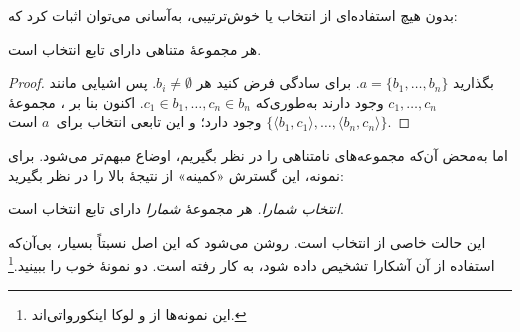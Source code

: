 \documentclass[../../../include/open-logic-section]{subfiles}
\begin{document}

بدون هیچ استفاده‌ای از انتخاب یا خوش‌ترتیبی، به‌آسانی می‌توان اثبات
کرد که:

\begin{lem}[در $\Zminus$]
هر مجموعهٔ متناهی دارای تابع انتخاب است.
\end{lem}

\begin{proof}
بگذارید $a = \{b_1, \ldots, b_n\}$. برای سادگی فرض کنید هر
$b_i \neq \emptyset$. پس اشیایی مانند
$c_1, \ldots, c_n$ وجود دارند به‌طوری‌که
$c_1 \in b_1, \ldots, c_n \in b_n$. اکنون بنا بر
، مجموعهٔ
$\{\langle b_1,c_1\rangle, \ldots, \langle b_n,c_n\rangle\}$ وجود
دارد؛ و این تابعی انتخاب برای~$a$ است.
\end{proof}

اما به‌محض آن‌که مجموعه‌های نامتناهی را در نظر بگیریم، اوضاع مبهم‌تر
می‌شود. برای نمونه، این گسترش «کمینه» از نتیجهٔ بالا را در نظر بگیرید:

\begin{defish}
\emph{انتخاب شمارا.} هر مجموعهٔ \emph{شمارا} دارای تابع انتخاب است.
\end{defish}

این حالت خاصی از انتخاب است. روشن می‌شود که این اصل نسبتاً بسیار،
بی‌آن‌که استفاده از آن آشکارا تشخیص داده شود، به کار رفته است. دو
نمونهٔ خوب را ببینید.\footnote{این نمونه‌ها از
\citet[\S9.4]{Potter2004} و لوکا اینکورواتی‌اند.}
\end{document}
